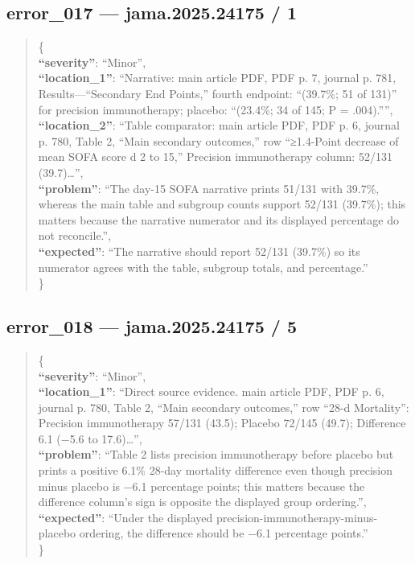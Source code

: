 \documentclass[
  letterpaper,
  9pt]{extreport}
\begin{document}
\hypertarget{error_017--jama202524175--1}{%
\subsection{error\_017 --- jama.2025.24175 /
1}\label{error_017--jama202524175--1}}

\begin{quote}
\{\\
\textbf{``severity''}: ``Minor'',\\
\textbf{``location\_1''}: ``Narrative: main article PDF, PDF p. 7,
journal p. 781, Results---``Secondary End Points,'' fourth endpoint:
``(39.7\%; 51 of 131)'' for precision immunotherapy; placebo: ``(23.4\%;
34 of 145; P = .004).'''',\\
\textbf{``location\_2''}: ``Table comparator: main article PDF, PDF p.
6, journal p. 780, Table 2, ``Main secondary outcomes,'' row
``≥1.4-Point decrease of mean SOFA score d 2 to 15,'' Precision
immunotherapy column: 52/131 (39.7)\ldots{}'',\\
\textbf{``problem''}: ``The day-15 SOFA narrative prints 51/131 with
39.7\%, whereas the main table and subgroup counts support 52/131
(39.7\%); this matters because the narrative numerator and its displayed
percentage do not reconcile.'',\\
\textbf{``expected''}: ``The narrative should report 52/131 (39.7\%) so
its numerator agrees with the table, subgroup totals, and
percentage.''\\
\}
\end{quote}

\hypertarget{error_018--jama202524175--5}{%
\subsection{error\_018 --- jama.2025.24175 /
5}\label{error_018--jama202524175--5}}

\begin{quote}
\{\\
\textbf{``severity''}: ``Minor'',\\
\textbf{``location\_1''}: ``Direct source evidence. main article PDF,
PDF p. 6, journal p. 780, Table 2, ``Main secondary outcomes,'' row
``28-d Mortality'': Precision immunotherapy 57/131 (43.5); Placebo
72/145 (49.7); Difference 6.1 (−5.6 to 17.6)\ldots{}'',\\
\textbf{``problem''}: ``Table 2 lists precision immunotherapy before
placebo but prints a positive 6.1\% 28-day mortality difference even
though precision minus placebo is −6.1 percentage points; this matters
because the difference column's sign is opposite the displayed group
ordering.'',\\
\textbf{``expected''}: ``Under the displayed
precision-immunotherapy-minus-placebo ordering, the difference should be
−6.1 percentage points.''\\
\}
\end{quote}
\end{document}
